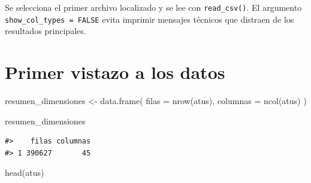 \documentclass[
  spanish,
  10.5pt,
  letterpaper,
  openany,
  headings=big]{scrbook}
\newenvironment{Shaded}{}{}
\newcommand{\AttributeTok}[1]{\textcolor[rgb]{0.84,0.23,0.29}{#1}}
\newcommand{\FunctionTok}[1]{\textcolor[rgb]{0.44,0.26,0.76}{#1}}
\newcommand{\NormalTok}[1]{\textcolor[rgb]{0.14,0.16,0.18}{#1}}
\newcommand{\OtherTok}[1]{\textcolor[rgb]{0.44,0.26,0.76}{#1}}
\begin{document}
\begin{tcolorbox}[enhanced jigsaw, arc=.35mm, bottomrule=.15mm, bottomtitle=1mm, breakable, colback=white, colbacktitle=quarto-callout-note-color!10!white, colframe=quarto-callout-note-color-frame, coltitle=black, left=2mm, leftrule=.75mm, opacityback=0, opacitybacktitle=0.6, rightrule=.15mm, title=\textcolor{quarto-callout-note-color}{\faInfo}\hspace{0.5em}{Explicación del código}, titlerule=0mm, toprule=.15mm, toptitle=1mm]

Se selecciona el primer archivo localizado y se lee con
\texttt{read\_csv()}. El argumento \texttt{show\_col\_types\ =\ FALSE}
evita imprimir mensajes técnicos que distraen de los resultados
principales.

\end{tcolorbox}

\section{Primer vistazo a los datos}\label{primer-vistazo-a-los-datos}

\begin{Shaded}
\begin{Highlighting}[]
\NormalTok{resumen\_dimensiones }\OtherTok{\textless{}{-}} \FunctionTok{data.frame}\NormalTok{(}
  \AttributeTok{filas =} \FunctionTok{nrow}\NormalTok{(atus),}
  \AttributeTok{columnas =} \FunctionTok{ncol}\NormalTok{(atus)}
\NormalTok{)}

\NormalTok{resumen\_dimensiones}
\end{Highlighting}
\end{Shaded}

\begin{verbatim}
#>    filas columnas
#> 1 390627       45
\end{verbatim}

\begin{Shaded}
\begin{Highlighting}[]
\FunctionTok{head}\NormalTok{(atus)}
\end{Highlighting}
\end{Shaded}
\end{document}
